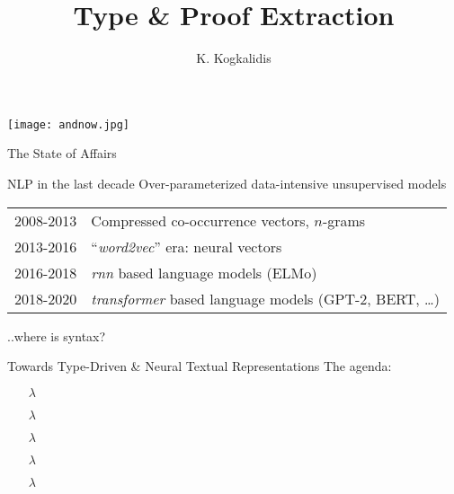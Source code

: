 \documentclass{beamer}
\title{Type \& Proof Extraction}
\author{K. Kogkalidis}
\institute{Logic \& Language 2020}
\begin{document}
\begin{frame}
\centering
\texttt{[image: andnow.jpg]}
\end{frame}

\begin{frame}{The State of Affairs}
\small
\begin{block}{NLP in the last decade}
	Over-parameterized data-intensive unsupervised models\\
	\begin{tabularx}{0.5\textwidth}{ll}
	2008-2013 & Compressed co-occurrence vectors, $n$-grams\\
	2013-2016 & ``\textit{word2vec}'' era: neural vectors\\
	2016-2018 & \textit{rnn} based language models (ELMo)\\
	2018-2020 & \textit{transformer} based language models (GPT-2, BERT, \dots)
	\end{tabularx}
\end{block}
\vfill

\pause
\begin{flushright}
	..where is syntax?
\end{flushright}

\end{frame}

\begin{frame}{Towards Type-Driven \& Neural Textual Representations}
\small
The agenda:
\begin{itemize}
	\item[$\lambda$] 
	\item[$\lambda$] 
	\item[$\lambda$] 
	\item[$\lambda$] 
	\item[$\lambda$] 
\end{itemize}
\end{frame}
\end{document}
